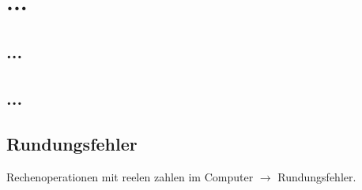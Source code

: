 

\newcommand{\myTitle}{\LaTeX - Grundlagen}
\newcommand{\myAuthor}{Dominik Wille}
\newcommand{\myDate}{22 Oktober 2013}
\newcommand{\myTitleImage}{images/typesetting} %
\newcommand{\myTitleLeft}{%
   Freie Universität Berlin\\
   Zentraleinrichtung für Datenverarbeitung\\
   Betriebsysteme und Programmieren%
}
\newcommand{\myTitleRight}{%
  Dozent: \\
  Dr.\,Herbert Voß
}


\myTitlepage
\section{...}
\subsection{...}
\subsection{...}
\subsection{Rundungsfehler}
Rechenoperationen mit reelen zahlen im Computer $\rightarrow$ Rundungsfehler.
